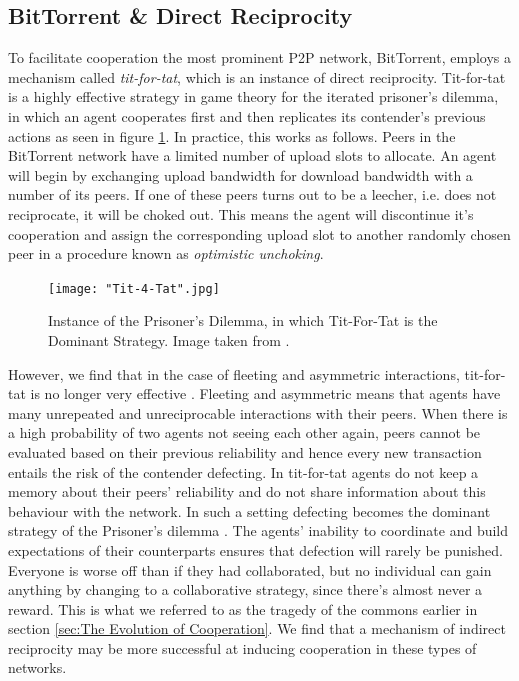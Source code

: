 \subsection{BitTorrent \& Direct Reciprocity}
\label{subsec:BitTorrent & Direct Reciprocity}
\noindent{}To facilitate cooperation the most prominent P2P network, BitTorrent, employs a mechanism called {\it tit-for-tat}, which is an instance of direct reciprocity. Tit-for-tat is a highly effective strategy in game theory for the iterated prisoner's dilemma, in which an agent cooperates first and then replicates its contender's previous actions as seen in figure \ref{fig:Instance of the Prisoner's Dilemma, in which Tit-For-Tat is the Dominant Strategy}. In practice, this works as follows. Peers in the BitTorrent network have a limited number of upload slots to allocate. An agent will begin by exchanging upload bandwidth for download bandwidth with a number of its peers. If one of these peers turns out to be a leecher, i.e. does not reciprocate, it will be choked out. This means the agent will discontinue it's cooperation and assign the corresponding upload slot to another randomly chosen peer in a procedure known as {\it optimistic unchoking}. \vspace{1em}\\

\begin{figure}[H]
\begin{center}
\texttt{[image: "Tit-4-Tat".jpg]}
\caption{Instance of the Prisoner's Dilemma, in which Tit-For-Tat is the Dominant Strategy. Image taken from \cite{Prisoner's Dilemma Image}.}
\label{fig:Instance of the Prisoner's Dilemma, in which Tit-For-Tat is the Dominant Strategy}
\end{center}
\end{figure}

\noindent{}However, we find that in the case of fleeting and asymmetric interactions, tit-for-tat is no longer very effective \cite{A Simple Rule for the Evolution of Cooperation on Graphs and Social Networks}. Fleeting and asymmetric means that agents have many unrepeated and unreciprocable interactions with their peers. When there is a high probability of two agents not seeing each other again, peers cannot be evaluated based on their previous reliability and hence every new transaction entails the risk of the contender defecting. In tit-for-tat agents do not keep a memory about their peers' reliability and do not share information about this behaviour with the network. In such a setting defecting becomes the dominant strategy of the Prisoner's dilemma \cite{An Optimal Strategy to Solve the Prisoner's Dilemma}. The agents' inability to coordinate and build expectations of their counterparts ensures that defection will rarely be punished. Everyone is worse off than if they had collaborated, but no individual can gain anything by changing to a collaborative strategy, since there's almost never a reward. This is what we referred to as the tragedy of the commons earlier in section \ref{sec:The Evolution of Cooperation}. We find that a mechanism of indirect reciprocity may be more successful at inducing cooperation in these types of networks. \vspace{1em}\\


